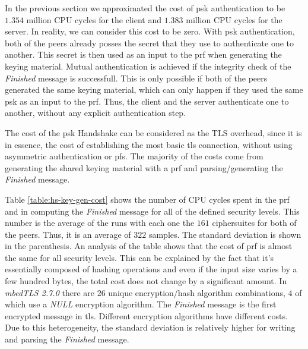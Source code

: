 In the previous section we approximated the cost of \gls{psk} authentication to be $1.354$ million CPU cycles
for the client and $1.383$ million CPU cycles for the server. In reality, we can consider this cost to be zero.
With \gls{psk} authentication, both of the peers already posses the secret that they use to authenticate one to another.
This secret is then used as an input to the \gls{prf} when generating the keying material. Mutual authentication is
achieved if the integrity check of the \textit{Finished} message is successfull. This is only possible if both of the peers
generated the same keying material, which can only happen if they used the same \gls{psk} as an input to the \gls{prf}.
Thus, the client and the server authenticate one to another, without any explicit authentication step.

The cost of the \gls{psk} Handshake can be considered as the TLS overhead, since it is in essence, the cost of establishing 
the most basic \gls{tls} connection, without using asymmetric authentication or \gls{pfs}. The majority of the costs 
come from generating the shared keying material with a \gls{prf} and parsing/generating the \textit{Finished} message.


Table \ref{table:hs-key-gen-cost} shows the number of CPU cycles spent in the \gls{prf}
and in computing the \textit{Finished} message for all of the defined security levels.
This number is the average of the runs with each one the $161$ ciphersuites for both of the peers. Thus, it is
an average of $322$ samples. The standard deviation is shown in the parenthesis.
An analysis of the table shows that the cost of \gls{prf} is almost the same for all security levels. This can be explained by
the fact that it's essentially composed of hashing operations and even if the input size varies
by a few hundred bytes, the total cost does not change by a significant amount.
In \textit{mbedTLS 2.7.0} there are $26$ unique encryption/hash algorithm combinations, $4$ of which use a \textit{NULL} encryption algorithm.
The \textit{Finished} message is the first encrypted message in \gls{tls}. Different encryption algorithms have different
costs. Due to this heterogeneity, the standard deviation is relatively higher for writing and parsing the 
\textit{Finished} message.

